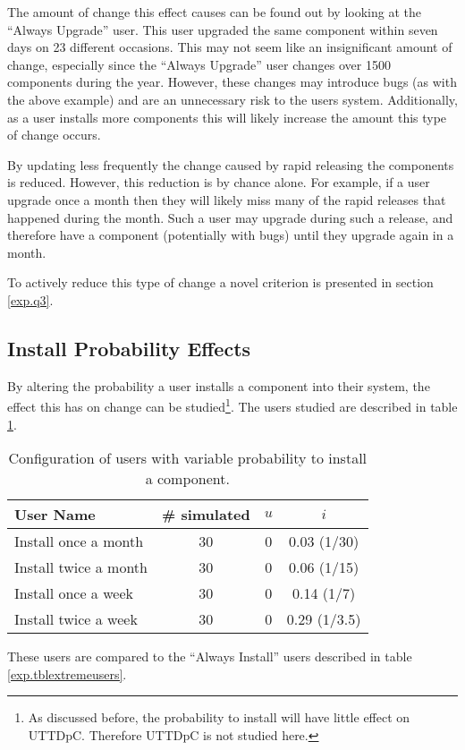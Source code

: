 The amount of change this effect causes can be found out by looking at the ``Always Upgrade'' user.
This user upgraded the same component within seven days on 23 different occasions.
This may not seem like an insignificant amount of change, especially since the ``Always Upgrade'' user changes over 1500 components during the year.
However, these changes may introduce bugs (as with the above example) and are an unnecessary risk to the users system.
Additionally, as a user installs more components this will likely increase the amount this type of change occurs.

By updating less frequently the change caused by rapid releasing the components is reduced.
However, this reduction is by chance alone.
For example, if a user upgrade once a month then they will likely miss many of the rapid releases that happened during the month.
Such a user may upgrade during such a release, and therefore have a component (potentially with bugs) until they upgrade again in a month.

To actively reduce this type of change a novel criterion is presented in section \ref{exp.q3}.

\subsection{Install Probability Effects}
By altering the probability a user installs a component into their system, the effect this has on 
change can be studied\footnote{As discussed before, the probability to install will have little effect on UTTDpC. Therefore UTTDpC is not studied here.}.
The users studied are described in table \ref{exp.tblq1cusers}.
\begin{table}[h!]
\centering
\begin{tabular}{|l | c | c | c |}
\hline
User Name 				& \# simulated 	& $u$ 		& $i$ 			\\ \hline
Install once a month	& 30 			& 0 & 0.03 (1/30)							 \\
Install twice a month	& 30 			& 0 & 0.06 (1/15)						\\
Install once a week		& 30 			& 0 & 0.14 (1/7)					 \\
Install twice a week 	& 30 			& 0 & 0.29 (1/3.5)						\\ \hline
\end{tabular}
\caption{Configuration of users with variable probability to install a component.}
\label{exp.tblq1cusers}
\end{table}
These users are compared to the ``Always Install'' users described in table \ref{exp.tblextremeusers}.

